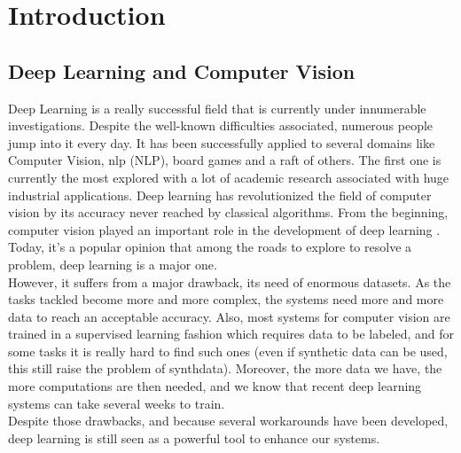 \documentclass[12pt, a4paper]{report}
\begin{document}
	\makeutbmfrontcover{}

	{
	\hypersetup{linkcolor=black}
	\tableofcontents
	}
	
	\printglossary
	
	\chapter{Introduction}
	\section{Deep Learning and Computer Vision}
	Deep Learning is a really successful field that is currently under innumerable investigations.
	Despite the well-known difficulties associated, numerous people jump into it every day.
	It has been successfully applied to several domains like Computer Vision, \gls{nlp} (NLP), board games and a raft of others.
	The first one is currently the most explored with a lot of academic research associated with huge industrial applications.
	Deep learning has revolutionized the field of computer vision by its accuracy never reached by classical algorithms.
	From the beginning, computer vision played an important role in the development of deep learning \cite{lecun_89,lecun_98}.
	Today, it's a popular opinion that among the roads to explore to resolve a problem, deep learning is a major one.\\
	However, it suffers from a major drawback, its need of enormous datasets.
	As the tasks tackled become more and more complex, the systems need more and more data to reach an acceptable accuracy.
	Also, most systems for computer vision are trained in a supervised learning fashion which requires data to be labeled, and for some tasks it is really hard to find such ones (even if synthetic data can be used, this still raise the problem of \gls{synthdata}).
	Moreover, the more data we have, the more computations are then needed, and we know that recent deep learning systems can take several weeks to train.\\
	
	Despite those drawbacks, and because several workarounds have been developed, deep learning is still seen as a powerful tool to enhance our systems.
\end{document}
